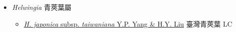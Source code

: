 
  \begin{itemize}
 \item[] \textit{Helwingia} 青莢葉屬
                                
  \begin{itemize}
        \item[] \href{http://www.theplantlist.org/tpl1.1/search?q=Helwingia+japonica+subsp.+taiwaniana}{\textit{H. japonica}  subsp. \textit{taiwaniana} Y.P. Yang \& H.Y. Liu}   臺灣青莢葉   LC
  \end{itemize}
  \end{itemize}
